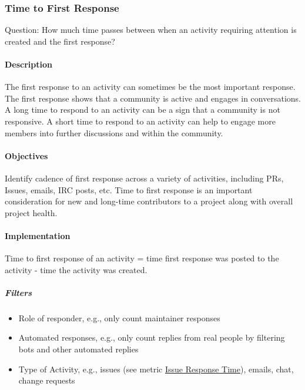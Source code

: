 \hypertarget{time-to-first-response}{%
\subsubsection{Time to First Response}\label{time-to-first-response}}

Question: How much time passes between when an activity requiring
attention is created and the first response?

\hypertarget{description}{%
\paragraph{Description}\label{description}}

The first response to an activity can sometimes be the most important
response. The first response shows that a community is active and
engages in conversations. A long time to respond to an activity can be a
sign that a community is not responsive. A short time to respond to an
activity can help to engage more members into further discussions and
within the community.

\hypertarget{objectives}{%
\paragraph{Objectives}\label{objectives}}

Identify cadence of first response across a variety of activities,
including PRs, Issues, emails, IRC posts, etc. Time to first response is
an important consideration for new and long-time contributors to a
project along with overall project health.

\hypertarget{implementation}{%
\paragraph{Implementation}\label{implementation}}

Time to first response of an activity = time first response was posted
to the activity - time the activity was created.

\hypertarget{filters}{%
\subparagraph{Filters}\label{filters}}

\begin{itemize}
\tightlist
\item
  Role of responder, e.g., only count maintainer responses
\item
  Automated responses, e.g., only count replies from real people by
  filtering bots and other automated replies
\item
  Type of Activity, e.g., issues (see metric
  \href{https://github.com/chaoss/wg-evolution/blob/master/metrics/Issue_Response_Time.md}{Issue
  Response Time}), emails, chat, change requests
\end{itemize}

